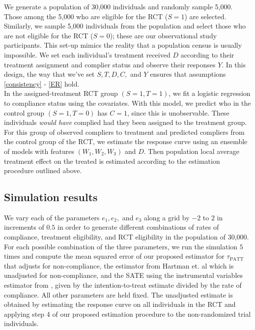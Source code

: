\documentclass[12pt]{article}
\begin{document}
We generate a population of 30,000 individuals and randomly sample 5,000.  Those among the 5,000 who are eligible for the RCT ($S=1$) are selected. Similarly, we sample 5,000 individuals from the population and select those who are not eligible for the RCT ($S=0$); these are our observational study participants. This set-up mimics the reality that a population census is usually impossible. We set each individual's treatment received $D$ according to their treatment assignment and complier status and observe their responses $Y$.  In this design, the way that we've set $S, T, D, C,$ and $Y$ ensures that assumptions \eqref{consistency} - \eqref{ER} hold.\\
 
In the assigned-treatment RCT group $(S = 1, T = 1)$, we fit a logistic regression to compliance status using the covariates.  With this model, we predict who in the control group $(S = 1, T = 0)$ has $C=1$, since this is unobservable.  These individuals \textit{would have} complied had they been assigned to the treatment group.  For this group of observed compliers to treatment and predicted compliers from the control group of the RCT, we estimate the response curve using an ensemble of models with features $(W_1, W_2, W_3)$ and $D$.  Then population local average treatment effect on the treated is estimated according to the estimation procedure outlined above.


\subsection{Simulation results}

We vary each of the parameters $e_1, e_2,$ and $e_3$ along a grid by $-2$ to $2$ in increments of $0.5$ in order to generate different combinations of rates of compliance, treatment eligibility, and RCT eligibility in the population of 30,000.  For each possible combination of the three parameters, we run the simulation $5$ times and compute the mean squared error of our proposed estimator for $\tau_{\text{PATT}}$ that adjusts for non-compliance, the estimator from Hartman et. al which is unadjusted for non-compliance, and the SATE using the instrumental variables estimator from \cite{Angrist1996}, given by the intention-to-treat estimate divided by the rate of compliance.  All other parameters are held fixed. The unadjusted estimate is obtained by estimating the response curve on all individuals in the RCT and applying step 4 of our proposed estimation procedure to the non-randomized trial individuals. \\
\end{document}
